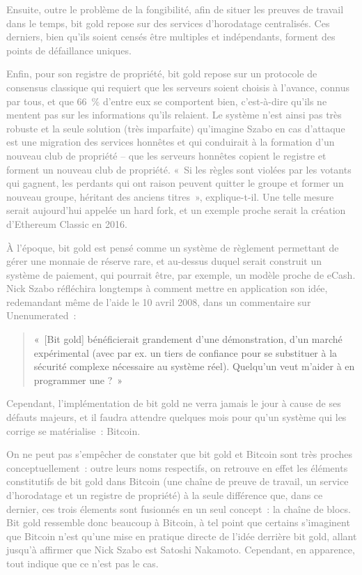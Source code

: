 \textcolor{gray}{Ensuite, outre le problème de la fongibilité, afin de situer les preuves de travail dans le temps, bit gold repose sur des services d'horodatage centralisés. Ces derniers, bien qu'ils soient censés être multiples et indépendants, forment des points de défaillance uniques.}

\textcolor{gray}{Enfin, pour son registre de propriété, bit gold repose sur un protocole de consensus classique qui requiert que les serveurs soient choisis à l'avance, connus par tous, et que 66~\% d'entre eux se comportent bien, c'est-à-dire qu'ils ne mentent pas sur les informations qu'ils relaient. Le système n'est ainsi pas très robuste et la seule solution (très imparfaite) qu'imagine Szabo en cas d'attaque est une migration des services honnêtes et qui conduirait à la formation d'un nouveau club de propriété – que les serveurs honnêtes copient le registre et forment un nouveau club de propriété. «~Si les règles sont violées par les votants qui gagnent, les perdants qui ont raison peuvent quitter le groupe et former un nouveau groupe, héritant des anciens titres~», explique-t-il. Une telle mesure serait aujourd'hui appelée un hard fork, et un exemple proche serait la création d'Ethereum Classic en 2016.}

\textcolor{gray}{À l'époque, bit gold est pensé comme un système de règlement permettant de gérer une monnaie de réserve rare, et au-dessus duquel serait construit un système de paiement, qui pourrait être, par exemple, un modèle proche de eCash. Nick Szabo réfléchira longtemps à comment mettre en application son idée, redemandant même de l'aide le 10 avril 2008, dans un commentaire sur Unenumerated~:}

\begin{quote}
«~[Bit gold] bénéficierait grandement d'une démonstration, d'un marché expérimental (avec par ex. un tiers de confiance pour se substituer à la sécurité complexe nécessaire au système réel). Quelqu'un veut m'aider à en programmer une ?~»
\end{quote}

\textcolor{gray}{Cependant, l'implémentation de bit gold ne verra jamais le jour à cause de ses défauts majeurs, et il faudra attendre quelques mois pour qu'un système qui les corrige se matérialise~: Bitcoin.}

\textcolor{gray}{On ne peut pas s'empêcher de constater que bit gold et Bitcoin sont très proches conceptuellement~: outre leurs noms respectifs, on retrouve en effet les éléments constitutifs de bit gold dans Bitcoin (une chaîne de preuve de travail, un service d'horodatage et un registre de propriété) à la seule différence que, dans ce dernier, ces trois élements sont fusionnés en un seul concept~: la chaîne de blocs. Bit gold ressemble donc beaucoup à Bitcoin, à tel point que certains s'imaginent que Bitcoin n'est qu'une mise en pratique directe de l'idée derrière bit gold, allant jusqu'à affirmer que Nick Szabo est Satoshi Nakamoto. Cependant, en apparence, tout indique que ce n'est pas le cas.}

